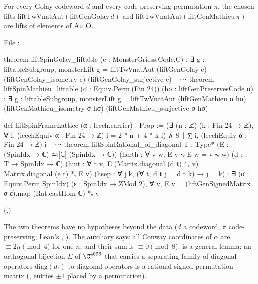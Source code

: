 \begin{theorem}\label{ch22:thm:monomial}
For every Golay codeword $d$ and every code-preserving permutation $\pi$, the chosen lifts
$\mathrm{liftTwVnatAut}(\mathrm{liftGenGolay}\,d)$ and $\mathrm{liftTwVnatAut}(\mathrm{liftGenMathieu}\,\pi)$ are lifts of
elements of $\mathrm{AutO}$.
\end{theorem}
\noindent File :
\begin{leancode}
theorem liftSpinGolay_liftable (c : MonsterGriess.Code.C) :
    ∃ g : liftableSubgroup, monsterLift g =
      liftTwVnatAut (liftGenGolay c) (liftGenGolay_isometry c) (liftGenGolay_surjective c)
-- ⋯
theorem liftSpinMathieu_liftable (σ : Equiv.Perm (Fin 24)) (hσ : liftGenPreservesCode σ) :
    ∃ g : liftableSubgroup, monsterLift g = liftTwVnatAut (liftGenMathieu σ hσ)
      (liftGenMathieu_isometry σ hσ) (liftGenMathieu_surjective σ hσ)
\end{leancode}
\begin{leancode}
def liftSpinFrameLattice (α : leech.carrier) : Prop :=
  (∃ (n : ℤ) (k : Fin 24 → ℤ),
    ∀ i, (leechEquiv α : Fin 24 → ℤ) i = 2 * n + 4 * k i) ∧
    8 ∣ ∑ i, (leechEquiv α : Fin 24 → ℤ) i
-- ⋯
theorem liftSpinRational_of_diagonal {T : Type*} (E : (SpinIdx → ℂ) ≃ₗ[ℂ] (SpinIdx → ℂ))
    (horth : ∀ v w, E v ⬝ᵥ E w = v ⬝ᵥ w)
    (d e : T → SpinIdx → ℂ)
    (hint : ∀ t v, E (Matrix.diagonal (d t) *ᵥ v) =
      Matrix.diagonal (e t) *ᵥ E v)
    (hsep : ∀ j k, (∀ t, d t j = d t k) → j = k) :
    ∃ (σ : Equiv.Perm SpinIdx) (ε : SpinIdx → ZMod 2),
      ∀ v, E v = (liftGenSignedMatrix σ ε).map (Rat.castHom ℂ) *ᵥ v
\end{leancode}
(.)
\begin{dictionary}
The two theorems have no hypotheses beyond the data ($d$ a codeword, $\pi$ code-preserving; Lean's , ).  The auxiliary
 says: all Conway coordinates of $\alpha$ are $\equiv2n\pmod4$ for one $n$, and their sum
is $\equiv0\pmod8$.   is a general lemma: an orthogonal bijection $E$ of $\C^{4096}$
that carries a separating family of diagonal operators $\mathrm{diag}(d_t)$ to diagonal operators is a rational signed
permutation matrix (, entries $\pm1$ placed by a permutation).
\end{dictionary}
